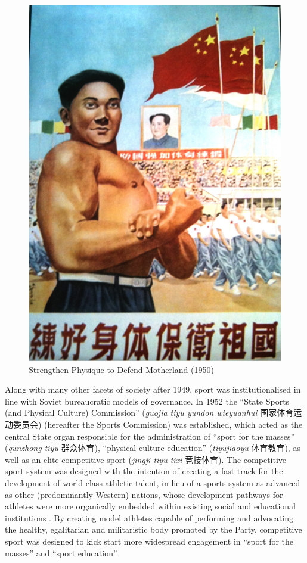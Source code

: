 {    \begin{figure}[htbp]
      \includegraphics[width = \linewidth]{images/motherlandStrength.png}
      \caption{Strengthen Physique to Defend Motherland (1950)}
      \label{fig:motherlandStrength}
    \end{figure}

Along with many other facets of society after 1949, sport was institutionalised in line with Soviet bureaucratic models of governance.  In 1952 the ``State Sports (and Physical Culture) Commission'' (\textit{guojia tiyu yundon wieyuanhui} 国家体育运动委员会) (hereafter the Sports Commission) was established, which acted as the central State organ responsible for the administration of ``sport for the masses'' (\textit{qunzhong tiyu} 群众体育), ``physical culture education'' (\textit{tiyujiaoyu} 体育教育), as well as an elite competitive sport (\textit{jingji tiyu tixi} 竞技体育).  The competitive sport system was designed with the intention of creating a fast track for the development of world class athletic talent, in lieu of a sports system as advanced as other (predominantly Western) nations, whose development pathways for athletes were more organically embedded within existing social and educational institutions \citep{Brownell2008}.  By creating model athletes capable of performing and advocating the healthy, egalitarian and militaristic body promoted by the Party, competitive sport was designed to kick start more widespread engagement in ``sport for the masses'' and ``sport education''\citep[56]{Brownell1995}.

}
